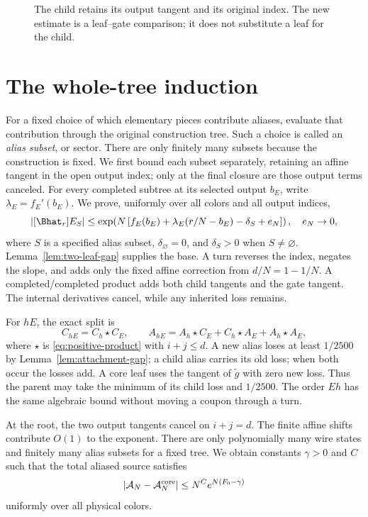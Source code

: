 \begin{figure}[ht]
\centering

\caption{The child retains its output tangent and its original index. The new estimate is a leaf--gate comparison; it does not substitute a leaf for the child.}\label{fig:alias-induction}
\end{figure}

\section{The whole-tree induction}

For a fixed choice of which elementary pieces contribute aliases, evaluate that contribution through the original construction tree. Such a choice is called an \emph{alias subset}, or sector. There are only finitely many subsets because the construction is fixed. We first bound each subset separately, retaining an affine tangent in the open output index; only at the final closure are those output terms canceled.
For every completed subtree at its selected output $b_E$, write $\lambda_E=f_E'(b_E)$. We prove, uniformly over all colors and all output indices,
\begin{equation}\label{eq:subtree-tangent}
 |[\Bhat_r]E_S|\le
 \exp\!\left(N\left[f_E(b_E)+\lambda_E(r/N-b_E)-\delta_S+e_N\right]\right),
 \quad e_N\to0,
\end{equation}
where $S$ is a specified alias subset, $\delta_\varnothing=0$, and $\delta_S>0$ when $S\ne\varnothing$. Lemma~\ref{lem:two-leaf-gap} supplies the base. A turn reverses the index, negates the slope, and adds only the fixed affine correction from $d/N=1-1/N$. A completed/completed product adds both child tangents and the gate tangent. The internal derivatives cancel, while any inherited loss remains.

For $hE$, the exact split is
\[
 C_{hE}=C_h\star C_E,\qquad
 A_{hE}=A_h\star C_E+C_h\star A_E+A_h\star A_E,
\]
where $\star$ is \eqref{eq:positive-product} with $i+j\le d$. A new alias loses at least $1/2500$ by Lemma~\ref{lem:attachment-gap}; a child alias carries its old loss; when both occur the losses add. A core leaf uses the tangent of $\widetilde g$ with zero new loss. Thus the parent may take the minimum of its child loss and $1/2500$. The order $Eh$ has the same algebraic bound without moving a coupon through a turn.

At the root, the two output tangents cancel on $i+j=d$. The finite affine shifts contribute $O(1)$ to the exponent. There are only polynomially many wire states and finitely many alias subsets for a fixed tree. We obtain constants $\gamma>0$ and $C$ such that the total aliased source satisfies
\begin{equation}\label{eq:whole-alias-gap}
 |\mathcal A_N-\mathcal A_N^{\rm core}|
 \le N^C e^{N(F_0-\gamma)}
\end{equation}
uniformly over all physical colors.

